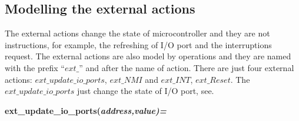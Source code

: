 \documentclass[11pt]{article} %
\begin{document}




\subsection{Modelling the external actions}
\label{sec:externalactions}

The external actions change the state of microcontroller and they are not
instructions, for example, the refreshing of I/O port and the interruptions
request. The external actions are also model by operations and they are named with the
prefix ``$ext\_$'' and after the name of action. There are just four external
actions: $ext\_update\_io\_ports$, $ext\_NMI$ and $ext\_INT$, $ext\_Reset$. The
$ext\_update\_io\_ports$ just change the state of I/O port, see.

\hspace*{0.20in}\bf ext\_update\_io\_ports\rm (\it address\rm ,\it value\rm )\rm =
\end{document}
